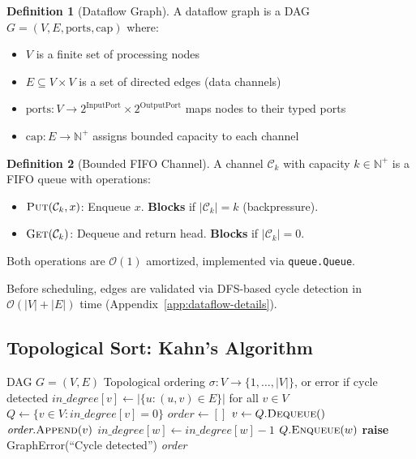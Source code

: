 \documentclass[11pt,a4paper,twoside]{article}
\theoremstyle{definition}
\newtheorem{definition}{Definition}[section]
\theoremstyle{remark}
\newcommand{\BigO}{\mathcal{O}}
\newcommand{\N}{\mathbb{N}}
\begin{document}
\begin{definition}[Dataflow Graph]
\label{def:dataflow}
A dataflow graph is a DAG $G = (V, E, \text{ports}, \text{cap})$ where:
\begin{itemize}
  \item $V$ is a finite set of processing nodes
  \item $E \subseteq V \times V$ is a set of directed edges (data channels)
  \item $\text{ports}: V \to 2^{\text{InputPort}} \times 2^{\text{OutputPort}}$ maps nodes to their typed ports
  \item $\text{cap}: E \to \N^+$ assigns bounded capacity to each channel
\end{itemize}
\end{definition}

\begin{definition}[Bounded FIFO Channel]
\label{def:channel}
A channel $\mathcal{C}_k$ with capacity $k \in \N^+$ is a FIFO queue with operations:
\begin{itemize}
  \item $\textsc{Put}(\mathcal{C}_k, x)$: Enqueue $x$. \textbf{Blocks} if $|\mathcal{C}_k| = k$ (backpressure).
  \item $\textsc{Get}(\mathcal{C}_k)$: Dequeue and return head. \textbf{Blocks} if $|\mathcal{C}_k| = 0$.
\end{itemize}
Both operations are $\BigO(1)$ amortized, implemented via \texttt{queue.Queue}.
\end{definition}

Before scheduling, edges are validated via DFS-based cycle detection in $\BigO(|V| + |E|)$ time (Appendix~\ref{app:dataflow-details}).

\subsection{Topological Sort: Kahn's Algorithm}

\begin{algorithm}[H]
\caption{\textsc{TopologicalSort}: Kahn's algorithm for dataflow scheduling order}
\label{alg:kahn}
\begin{algorithmic}[1]
\Require DAG $G = (V, E)$
\Ensure Topological ordering $\sigma: V \to \{1, \ldots, |V|\}$, or error if cycle detected
\State $\textit{in\_degree}[v] \gets |\{u : (u,v) \in E\}|$ for all $v \in V$ 
\State $Q \gets \{v \in V : \textit{in\_degree}[v] = 0\}$ 
\State $\textit{order} \gets []$
  \State $v \gets Q.\textsc{Dequeue}()$
  \State $\textit{order}.\textsc{Append}(v)$
    \State $\textit{in\_degree}[w] \gets \textit{in\_degree}[w] - 1$
      \State $Q.\textsc{Enqueue}(w)$
    \EndIf
  \EndFor
\EndWhile
{}
  \State \textbf{raise} GraphError(``Cycle detected'')
\EndIf
\State \Return \textit{order}
\end{algorithmic}
\end{algorithm}
\end{document}
